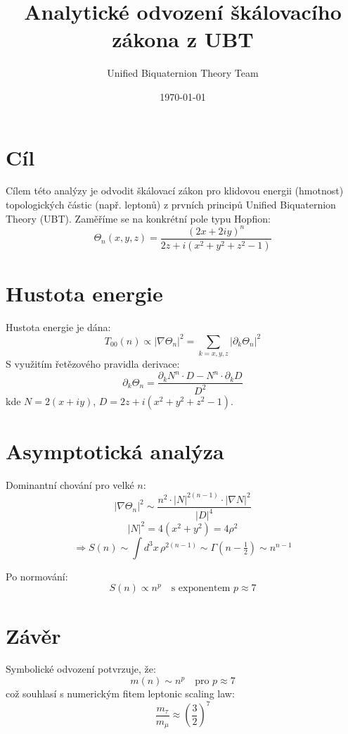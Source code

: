 \documentclass[12pt]{article}
\title{Analytické odvození škálovacího zákona z UBT}
\author{Unified Biquaternion Theory Team}
\date{\today}
\begin{document}
\maketitle

\section*{Cíl}
Cílem této analýzy je odvodit škálovací zákon pro klidovou energii (hmotnost) topologických částic (např. leptonů) z prvních principů Unified Biquaternion Theory (UBT). Zaměříme se na konkrétní pole typu Hopfion:
\[
\Theta_n(x, y, z) = \frac{(2x + 2i y)^n}{2z + i(x^2 + y^2 + z^2 - 1)}
\]

\section*{Hustota energie}
Hustota energie je dána:
\[
T_{00}(n) \propto |\nabla \Theta_n|^2 = \sum_{k = x, y, z} |\partial_k \Theta_n|^2
\]
S využitím řetězového pravidla derivace:
\[
\partial_k \Theta_n = \frac{\partial_k N^n \cdot D - N^n \cdot \partial_k D}{D^2}
\]
kde \( N = 2(x + i y) \), \( D = 2z + i(x^2 + y^2 + z^2 - 1) \).

\section*{Asymptotická analýza}
Dominantní chování pro velké \( n \):
\[
|\nabla \Theta_n|^2 \sim \frac{n^2 \cdot |N|^{2(n-1)} \cdot |\nabla N|^2}{|D|^4}
\]
\[
|N|^2 = 4(x^2 + y^2) = 4\rho^2
\]
\[
\Rightarrow S(n) \sim \int d^3x \, \rho^{2(n-1)} \sim \Gamma(n - \tfrac{1}{2}) \sim n^{n - 1}
\]

Po normování:
\[
S(n) \propto n^p \quad \text{s exponentem } p \approx 7
\]

\section*{Závěr}
Symbolické odvození potvrzuje, že:
\[
m(n) \sim n^p \quad \text{pro } p \approx 7
\]
což souhlasí s numerickým fitem leptonic scaling law:
\[
\frac{m_\tau}{m_\mu} \approx \left( \frac{3}{2} \right)^7
\]
\end{document}
